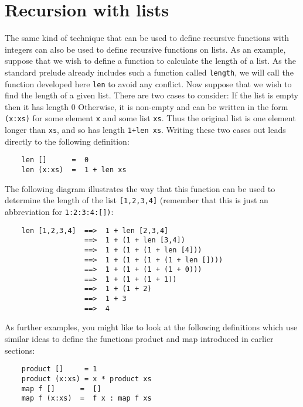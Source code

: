 \section{Recursion with lists}
The same kind of  technique  that  can  be  used  to  define  recursive
functions with integers can also be used to define recursive  functions
on lists.  As an example, suppose that we wish to define a function  to
calculate the length of  a  list.   As  the  standard  prelude  already
includes such a function called \verb"length", we  will  call  the  function
developed here \verb"len" to avoid any conflict.  Now suppose that  we  wish
to find the length of a given list.  There are two cases to consider:
\BSI
\IT  If the list is empty then it has length 0
\IT  Otherwise, it is non-empty and can be written in the  form  \verb"(x:xs)"
     for some element \verb"x" and some list \verb"xs".
     Thus the  original  list  is
     one element longer than \verb"xs", and so has length \verb"1+len xs".
\ESI
Writing these two cases out leads directly to the following definition:
\begin{verbatim}
    len []      =  0
    len (x:xs)  =  1 + len xs
\end{verbatim}
The following diagram illustrates the way that  this  function  can  be
used to determine the length of the list \verb"[1,2,3,4]" (remember that  this
is just an abbreviation for \verb"1:2:3:4:[])":
\begin{verbatim}
    len [1,2,3,4]  ==>  1 + len [2,3,4]
                   ==>  1 + (1 + len [3,4])
                   ==>  1 + (1 + (1 + len [4]))
                   ==>  1 + (1 + (1 + (1 + len [])))
                   ==>  1 + (1 + (1 + (1 + 0)))
                   ==>  1 + (1 + (1 + 1))
                   ==>  1 + (1 + 2)
                   ==>  1 + 3
                   ==>  4
\end{verbatim}
As  further  examples,  you  might  like  to  look  at  the   following
definitions which use similar ideas to define the functions product and
map introduced in earlier sections:
\begin{verbatim}
    product []     = 1
    product (x:xs) = x * product xs
    map f []      =  []
    map f (x:xs)  =  f x : map f xs
\end{verbatim}


